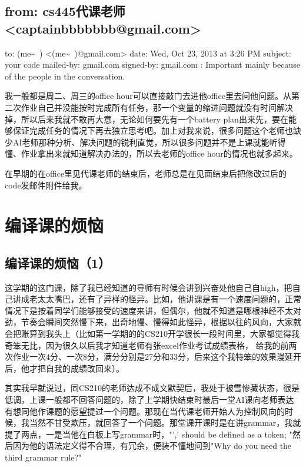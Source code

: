 \documentclass[12pt]{book}
\begin{document}
\section{from:         cs445代课老师 <captainbbbbbbb@gmail.com>}
\label{sec-23-3}
to:         (me\textasciitilde{}~) <(me\textasciitilde{}~)@gmail.com>
date:         Wed, Oct 23, 2013 at 3:26 PM
subject:         your code
mailed-by:         gmail.com
signed-by:         gmail.com
:         Important mainly because of the people in the conversation.

我一般都是周二、周三的office hour可以直接敲门去进他office里去问他问题。从第二次作业自己并没能按时完成所有任务，那一个变量的缩进问题就没有时间解决掉，所以后来我就不敢再大意，无论如何要先有一个battery plan出来先，要在能够保证完成任务的情况下再去独立思考吧。加上对我来说，很多问题这个老师也缺少AI老师那种分析、解决问题的锐利直觉，所以很多问题并不是上课就能听得懂、作业拿出来就知道解决办法的，所以去老师的office hour的情况也就多起来。

在早期的在office里见代课老师的结束后，老师总是在见面结束后把修改过后的code发邮件附件给我。

\chapter{编译课的烦恼}
\label{sec-24}
\section{编译课的烦恼（1）}
\label{sec-24-1}

这学期的这门课，除了我已经知道的导师有时候会讲到兴奋处他自己自high，把自己讲成老太太嘴巴，还有了异样的怪异。比如，他讲课是有一个速度问题的，正常情况下是按着同学们能够接受的速度来讲，但偶尔，他就不知道是哪根神经不太对劲，节奏会瞬间突然慢下来，出奇地慢、慢得如此怪异，根据以往的风向，大家就会把账算到我头上（比如第一学期的的CS210开学很长一段时间里，大家都觉得我奇笨无比，因为很久以后我才知道老师有张excel作业考试成绩表格，
给我的前两次作业一次4分、一次8分，满分分别是27分和33分，后来这个我特笨的效果漫延开后，他才把自我的成绩改回来）。

其实我早就说过，同CS210的老师达成不成文默契后，我处于被雪惨藏状态，很是低调，上课一般都不回答问题的，除了上学期快结束时最后一堂AI课向老师表达有想同他作课题的愿望提过一个问题。那现在当代课老师开始人为控制风向的时候，我当然不甘受欺压，就回答了一个问题。那堂课开课时是在讲grammar，我就提了两点，一是当他在白板上写grammar时，"',' should be defined as a token; "然后因为他的语法定义得不合理，有冗余，便装不懂地问到"Why do you need the third grammar rule?"
\end{document}
